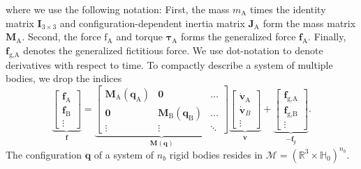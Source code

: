\documentclass[preprint,12pt]{elsarticle}
\let\vec\bm
\let\mat\mathbf
\numberwithin{equation}{section}
\def\conf{q}
\def\tA{\text{A}}
\def\tB{\text{B}}
\def\tg{\text{g}}
\begin{document}
where we use the following notation:
First, the mass $m_\tA$ times the identity matrix $\mat{I}_{3\times3}$ and configuration-dependent inertia matrix $\mat{J}_\tA$ form the mass matrix $\mat{M}_\tA$.
Second, the force $\vec{\mathrm{f}}_\tA$ and torque $\vec{\tau}_\tA$ forms the generalized force $\vec{f}_\tA$.
Finally, $\vec{f}_{\tg,\tA}$ denotes the generalized fictitious force.
We use dot-notation to denote derivatives with respect to time.
To compactly describe a system of multiple bodies, we drop the indices
\begin{equation}
    \label{eq:newton_euler_multiple_bodies}
    \underbrace{
        \begin{bmatrix}
            \vec{f}_\tA \\ \vec{f}_\tB \\ \vdots
        \end{bmatrix}
    }_{\vec{f}}
    =
    \underbrace{
        \begin{bmatrix}
            \mat{M}_\tA(\vec{\conf}_\tA) & \mat{0}   & \hdots \\
            \mat{0}   & \mat{M}_\tB (\vec{\conf}_\tB) & \hdots \\
            \vdots    & \vdots    & \ddots
        \end{bmatrix}
    }_{\mat{M}(\vec{\conf})}
    \underbrace{
        \begin{bmatrix}
            \dot{\vec{v}}_\tA \\ \dot{\vec{v}}_B \\ \vdots
        \end{bmatrix}
    }_{\dot{\vec{v}}}
    +
    \underbrace{
        \begin{bmatrix}
            \vec{f}_{\tg, \tA} \\ \vec{f}_{\tg, \tB}  \\ \vdots
        \end{bmatrix}
    }_{-\vec{f}_g}.
\end{equation}
The configuration $\vec{\conf}$ of a system of $n_b$ rigid bodies resides in $\mathcal{M} = (\mathbb{R}^3 \times \mathbb{H}_0)^{n_b}$.
\end{document}
